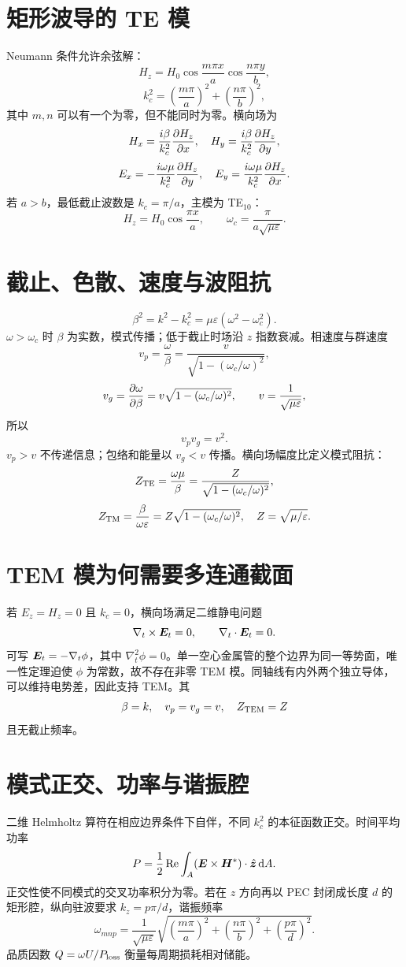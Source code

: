 \section{矩形波导的 TE 模}
Neumann 条件允许余弦解：
\[
H_z=H_0\cos\frac{m\pi x}{a}\cos\frac{n\pi y}{b},
\]
\[
k_c^2=\left(\frac{m\pi}{a}\right)^2+
\left(\frac{n\pi}{b}\right)^2,
\]
其中 $m,n$ 可以有一个为零，但不能同时为零。横向场为
\[
H_x=\frac{i\beta}{k_c^2}\frac{\partial H_z}{\partial x},\quad
H_y=\frac{i\beta}{k_c^2}\frac{\partial H_z}{\partial y},
\]
\[
E_x=-\frac{i\omega\mu}{k_c^2}\frac{\partial H_z}{\partial y},\quad
E_y=\frac{i\omega\mu}{k_c^2}\frac{\partial H_z}{\partial x}.
\]
若 $a>b$，最低截止波数是 $k_c=\pi/a$，主模为 TE$_{10}$：
\[
H_z=H_0\cos\frac{\pi x}{a},\qquad
\omega_c=\frac{\pi}{a\sqrt{\mu\varepsilon}}.
\]

\section{截止、色散、速度与波阻抗}
\[
\boxed{\beta^2=k^2-k_c^2
=\mu\varepsilon(\omega^2-\omega_c^2)}.
\]
$\omega>\omega_c$ 时 $\beta$ 为实数，模式传播；低于截止时场沿 $z$ 指数衰减。相速度与群速度
\[
v_p=\frac{\omega}{\beta}
=\frac{v}{\sqrt{1-(\omega_c/\omega)^2}},
\]
\[
v_g=\frac{\partial \omega}{\partial \beta}
=v\sqrt{1-(\omega_c/\omega)^2},
\qquad v=\frac1{\sqrt{\mu\varepsilon}},
\]
所以
\[
\boxed{v_pv_g=v^2}.
\]
$v_p>v$ 不传递信息；包络和能量以 $v_g<v$ 传播。横向场幅度比定义模式阻抗：
\[
Z_{\rm TE}=\frac{\omega\mu}{\beta}
=\frac{Z}{\sqrt{1-(\omega_c/\omega)^2}},
\]
\[
Z_{\rm TM}=\frac{\beta}{\omega\varepsilon}
=Z\sqrt{1-(\omega_c/\omega)^2},
\quad Z=\sqrt{\mu/\varepsilon}.
\]

\section{TEM 模为何需要多连通截面}
若 $E_z=H_z=0$ 且 $k_c=0$，横向场满足二维静电问题
\[
\nabla_t\times\bm{E}_t=0,\qquad
\nabla_t\cdot\bm{E}_t=0.
\]
可写 $\bm{E}_t=-\nabla_t\phi$，其中 $\nabla_t^2\phi=0$。单一空心金属管的整个边界为同一等势面，唯一性定理迫使 $\phi$ 为常数，故不存在非零 TEM 模。同轴线有内外两个独立导体，可以维持电势差，因此支持 TEM。其
\[
\beta=k,\quad v_p=v_g=v,\quad Z_{\rm TEM}=Z
\]
且无截止频率。

\section{模式正交、功率与谐振腔}
二维 Helmholtz 算符在相应边界条件下自伴，不同 $k_c^2$ 的本征函数正交。时间平均功率
\[
P=\frac12\operatorname{Re}\int_A
(\bm{E}\times\bm{H}^*)\cdot\hat{\bm{z}}\,\mathrm d A.
\]
正交性使不同模式的交叉功率积分为零。若在 $z$ 方向再以 PEC 封闭成长度 $d$ 的矩形腔，纵向驻波要求
$k_z=p\pi/d$，谐振频率
\[
\boxed{
\omega_{mnp}=\frac1{\sqrt{\mu\varepsilon}}
\sqrt{\left(\frac{m\pi}{a}\right)^2+
\left(\frac{n\pi}{b}\right)^2+
\left(\frac{p\pi}{d}\right)^2}}.
\]
品质因数 $Q=\omega U/P_{\rm loss}$ 衡量每周期损耗相对储能。


